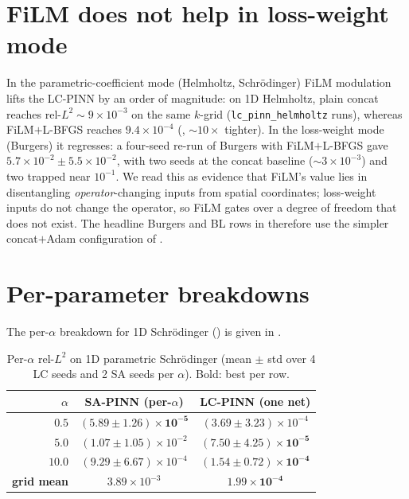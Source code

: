 \documentclass{article}
\theoremstyle{plain}
\theoremstyle{definition}
\theoremstyle{remark}
\begin{document}
\section{FiLM does not help in loss-weight mode}
\label{sec:appendix-film-loss-weight}

In the parametric-coefficient mode (Helmholtz, Schrödinger) FiLM
modulation lifts the LC-PINN by an order of magnitude: on 1D
Helmholtz, plain concat reaches rel-$L^2 \!\sim\!9\!\times\!10^{-3}$
on the same $k$-grid (\texttt{lc\_pinn\_helmholtz} runs), whereas
FiLM$+$L-BFGS reaches $9.4\!\times\!10^{-4}$ (,
$\sim\!10\times$ tighter). In the loss-weight mode (Burgers) it
regresses: a four-seed re-run of Burgers with
FiLM$+$L-BFGS gave $5.7\!\times\!10^{-2} \pm 5.5\!\times\!10^{-2}$,
with two seeds at the concat baseline ($\sim\!3\!\times\!10^{-3}$)
and two trapped near $10^{-1}$. We read this as evidence that
FiLM's value lies in disentangling \emph{operator}-changing inputs
from spatial coordinates; loss-weight inputs do not change the
operator, so FiLM gates over a degree of freedom that does not
exist. The headline Burgers and BL rows in
 therefore use the simpler
concat$+$Adam configuration of \citet{dosovitskiy2020}.

\section{Per-parameter breakdowns}
\label{sec:appendix-per-param}

The per-$\alpha$ breakdown for 1D Schrödinger
() is given in
.

\begin{table}[h]
\centering
\caption{Per-$\alpha$ rel-$L^2$ on 1D parametric Schrödinger
(mean $\pm$ std over 4 LC seeds and 2 SA seeds per $\alpha$).
Bold: best per row.}
\label{tab:schrod-per-alpha}
\small
\begin{tabular}{r|cc}
\toprule
$\alpha$ & SA-PINN (per-$\alpha$) & LC-PINN (one net) \\
\midrule
$0.5$  & $\mathbf{(5.89\!\pm\!1.26)\!\times\!10^{-5}}$ & $(3.69\!\pm\!3.23)\!\times\!10^{-4}$ \\
$5.0$  & $(1.07\!\pm\!1.05)\!\times\!10^{-2}$ & $\mathbf{(7.50\!\pm\!4.25)\!\times\!10^{-5}}$ \\
$10.0$ & $(9.29\!\pm\!6.67)\!\times\!10^{-4}$ & $\mathbf{(1.54\!\pm\!0.72)\!\times\!10^{-4}}$ \\
\midrule
\textbf{grid mean} & $3.89\!\times\!10^{-3}$ & $\mathbf{1.99\!\times\!10^{-4}}$ \\
\bottomrule
\end{tabular}
\end{table}
\end{document}

